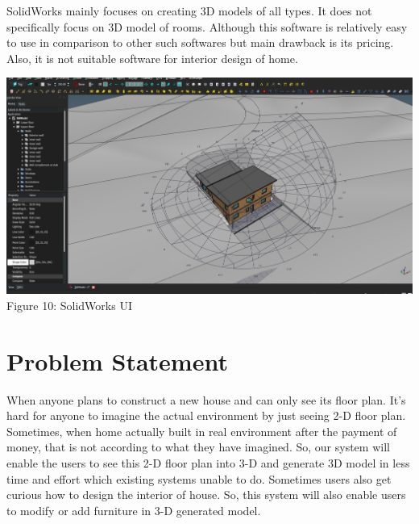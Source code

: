 \documentclass{article}
\begin{document}
SolidWorks mainly focuses on creating 3D models of all types. It does not specifically focus on 3D model of rooms. Although this software is relatively easy to use in comparison to other such softwares but main drawback is its pricing.  Also, it is not suitable software for interior design of home.\cite{freecad}\\
\begin{center}
\includegraphics[scale=0.3]{SolidWorks}
\\Figure 10: SolidWorks UI
\end{center}

\section{Problem Statement}
When anyone plans to construct a new house and can only see its floor plan. It’s hard for anyone to imagine the actual environment by just seeing 2-D floor plan. Sometimes, when home actually built in real environment after the payment of money, that is not according to what they have imagined. So, our system will enable the users to see this 2-D floor plan into 3-D and generate 3D  model in less time and effort which existing systems unable to do. Sometimes users also get curious how to design the interior of house.  So, this system will also enable users to modify or add furniture in 3-D generated model.
\end{document}
